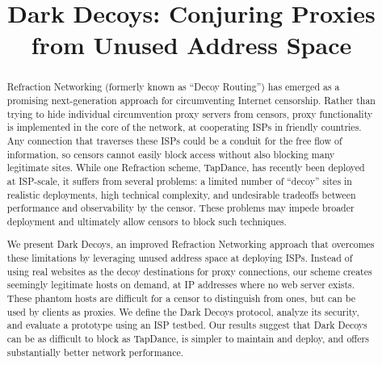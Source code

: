 \documentclass[letterpaper,twocolumn,10pt]{article}
\begin{document}
\date{}

\title{\Large \bf Dark Decoys:
  Conjuring Proxies from Unused Address Space}


\maketitle

\newcommand{\scheme}{Dark Decoys\xspace}

\begin{abstract}
Refraction Networking (formerly known as ``Decoy Routing'') has
emerged as a promising next-generation approach for circumventing
Internet censorship. Rather than trying to hide individual
circumvention proxy servers from censors, proxy functionality is
implemented in the core of the network, at cooperating ISPs in
friendly countries.  Any connection that traverses these ISPs could be
a conduit for the free flow of information, so censors cannot easily
block access without also blocking many legitimate sites.  While one
Refraction scheme, TapDance, has recently been deployed at ISP-scale,
it suffers from several problems: a limited number of ``decoy'' sites
in realistic deployments, high technical complexity, and undesirable
tradeoffs between performance and observability by the censor. These
problems may impede broader deployment and ultimately allow censors to
block such techniques.

We present \scheme, an improved Refraction Networking approach
that overcomes these limitations by leveraging unused address space at
deploying ISPs. Instead of using real websites as the decoy destinations
for proxy connections, our scheme creates seemingly legitimate hosts
on demand, at IP addresses where no web server exists.
These phantom hosts are difficult for a censor to distinguish from
ones, but can be used by clients as proxies.  We define the
\scheme protocol, analyze its security, and evaluate a
prototype using an ISP testbed.
Our results suggest that \scheme can be as difficult to block
as TapDance, is simpler to maintain and deploy,
and offers substantially better network performance.

\end{abstract}
\end{document}
